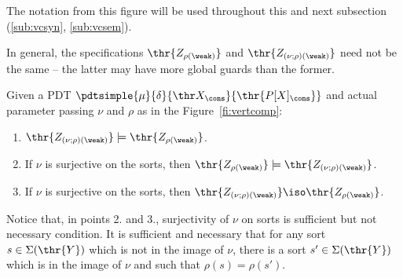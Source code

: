 \noindent
The notation from this figure will be used throughout this and next
subsection (\ref{sub:vcsyn}, \ref{sub:vcsem}).

In general, the specifications $\thr{Z_{\rho(\weak)}}$ and
$\thr{Z_{(\nu;\rho)(\weak)}}$ need not be the same -- the latter may have
more global guards than the former.
\begin{fact}\label{fa:triv}
Given a PDT $\pdtsimple{\mu}{\delta}{\thr X_\cons}{\thr{P[X]_\cons}}$
and actual parameter passing $\nu$
and $\rho$ as in the Figure~\ref{fi:vertcomp}: 
\begin{enumerate}\MyLPar
\item $\thr{Z_{(\nu;\rho)(\weak)}}\models \thr{Z_{\rho(\weak)}}$.
\item If $\nu$ is surjective on the sorts, then $\thr{Z_{\rho(\weak)}}\models
\thr{Z_{(\nu;\rho)(\weak)}}$.
\item If $\nu$ is
surjective on the sorts, then $\thr{Z_{(\nu;\rho)(\weak)}} \iso \thr{Z_{\rho(\weak)}}$.
\end{enumerate}
\end{fact}
Notice that, in points 2. and 3., surjectivity of $\nu$ on sorts is sufficient but
not necessary condition. It is sufficient and necessary that for any sort $s\in\Sigma(\thr{Y})$
which is not in the image of $\nu$, there is a sort  $s'\in\Sigma(\thr{Y})$ which
is in the image of $\nu$ and such that $\rho(s)=\rho(s')$.

